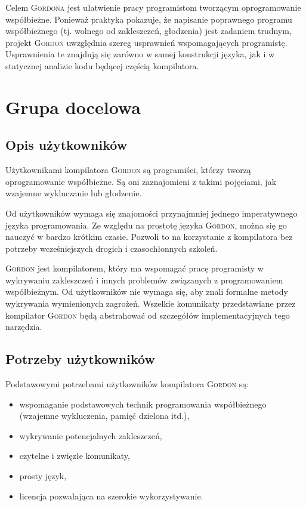\documentclass{documentation}
\begin{document}
Celem \textsc{Gordona} jest ułatwienie pracy programistom tworzącym
oprogramowanie współbieżne. Ponieważ praktyka pokazuje, że napisanie poprawnego
programu współbieżnego (tj. wolnego od zakleszczeń, głodzenia) jest zadaniem
trudnym, projekt \textsc{Gordon} uwzględnia szereg usprawnień wspomagających
programistę. Usprawnienia te znajdują się zarówno w samej konstrukcji języka,
jak i w statycznej analizie kodu będącej częścią kompilatora.

\section{Grupa docelowa}
\subsection{Opis użytkowników}
\noindent Użytkownikami kompilatora \textsc{Gordon} są programiści, którzy
tworzą oprogramowanie współbieżne. Są oni zaznajomieni z takimi pojęciami, jak
wzajemne wykluczanie lub głodzenie.

Od użytkowników wymaga się znajomości przynajmniej jednego imperatywnego języka
programowania. Ze względu na prostotę języka \textsc{Gordon}, można się go
nauczyć w bardzo krótkim czasie. Pozwoli to na korzystanie z kompilatora bez
potrzeby wcześniejszych drogich i czasochłonnych szkoleń.

\textsc{Gordon} jest kompilatorem, który ma wspomagać pracę programisty w
wykrywaniu zakleszczeń i innych problemów związanych z programowaniem
współbieżnym. Od użytkowników nie wymaga się, aby znali formalne metody
wykrywania wymienionych zagrożeń. Wszelkie komunikaty przedstawiane przez
kompilator \textsc{Gordon} będą abstrahować od szczegółów implementacyjnych
tego narzędzia.

\subsection{Potrzeby użytkowników}
\noindent Podstawowymi potrzebami użytkowników kompilatora \textsc{Gordon} są:
\begin{itemize}
\item wspomaganie podstawowych technik programowania współbieżnego (wzajemne
wykluczenia, pamięć dzielona itd.),
\item wykrywanie potencjalnych zakleszczeń,
\item czytelne i zwięzłe komunikaty,
\item prosty język,
\item licencja pozwalająca na szerokie wykorzystywanie.
\end{itemize}
\end{document}
